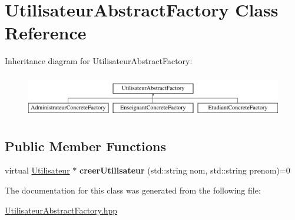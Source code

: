 \hypertarget{classUtilisateurAbstractFactory}{\section{Utilisateur\-Abstract\-Factory Class Reference}
\label{classUtilisateurAbstractFactory}
}
Inheritance diagram for Utilisateur\-Abstract\-Factory\-:\begin{figure}[H]
\begin{center}
\leavevmode
\includegraphics[height=1.895093cm]{classUtilisateurAbstractFactory}
\end{center}
\end{figure}
\subsection*{Public Member Functions}
\begin{DoxyCompactItemize}
\item 
\hypertarget{classUtilisateurAbstractFactory_ac674113eb7df62e4c208bff5d7ec53d3}{virtual \hyperlink{classUtilisateur}{Utilisateur} $\ast$ {\bfseries creer\-Utilisateur} (std\-::string nom, std\-::string prenom)=0}\label{classUtilisateurAbstractFactory_ac674113eb7df62e4c208bff5d7ec53d3}

\end{DoxyCompactItemize}


The documentation for this class was generated from the following file\-:\begin{DoxyCompactItemize}
\item 
\hyperlink{UtilisateurAbstractFactory_8hpp}{Utilisateur\-Abstract\-Factory.\-hpp}\end{DoxyCompactItemize}
